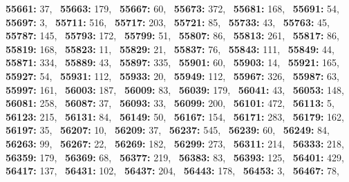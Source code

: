 \textbf{55661:} 37,\allowbreak~ 
\textbf{55663:} 179,\allowbreak~ 
\textbf{55667:} 60,\allowbreak~ 
\textbf{55673:} 372,\allowbreak~ 
\textbf{55681:} 168,\allowbreak~ 
\textbf{55691:} 54,\allowbreak~ 
\textbf{55697:} 3,\allowbreak~ 
\textbf{55711:} 516,\allowbreak~ 
\textbf{55717:} 203,\allowbreak~ 
\textbf{55721:} 85,\allowbreak~ 
\textbf{55733:} 43,\allowbreak~ 
\textbf{55763:} 45,\allowbreak~ 
\textbf{55787:} 145,\allowbreak~ 
\textbf{55793:} 172,\allowbreak~ 
\textbf{55799:} 51,\allowbreak~ 
\textbf{55807:} 86,\allowbreak~ 
\textbf{55813:} 261,\allowbreak~ 
\textbf{55817:} 86,\allowbreak~ 
\textbf{55819:} 168,\allowbreak~ 
\textbf{55823:} 11,\allowbreak~ 
\textbf{55829:} 21,\allowbreak~ 
\textbf{55837:} 76,\allowbreak~ 
\textbf{55843:} 111,\allowbreak~ 
\textbf{55849:} 44,\allowbreak~ 
\textbf{55871:} 334,\allowbreak~ 
\textbf{55889:} 43,\allowbreak~ 
\textbf{55897:} 335,\allowbreak~ 
\textbf{55901:} 60,\allowbreak~ 
\textbf{55903:} 14,\allowbreak~ 
\textbf{55921:} 165,\allowbreak~ 
\textbf{55927:} 54,\allowbreak~ 
\textbf{55931:} 112,\allowbreak~ 
\textbf{55933:} 20,\allowbreak~ 
\textbf{55949:} 112,\allowbreak~ 
\textbf{55967:} 326,\allowbreak~ 
\textbf{55987:} 63,\allowbreak~ 
\textbf{55997:} 161,\allowbreak~ 
\textbf{56003:} 187,\allowbreak~ 
\textbf{56009:} 83,\allowbreak~ 
\textbf{56039:} 179,\allowbreak~ 
\textbf{56041:} 43,\allowbreak~ 
\textbf{56053:} 148,\allowbreak~ 
\textbf{56081:} 258,\allowbreak~ 
\textbf{56087:} 37,\allowbreak~ 
\textbf{56093:} 33,\allowbreak~ 
\textbf{56099:} 200,\allowbreak~ 
\textbf{56101:} 472,\allowbreak~ 
\textbf{56113:} 5,\allowbreak~ 
\textbf{56123:} 215,\allowbreak~ 
\textbf{56131:} 84,\allowbreak~ 
\textbf{56149:} 50,\allowbreak~ 
\textbf{56167:} 154,\allowbreak~ 
\textbf{56171:} 283,\allowbreak~ 
\textbf{56179:} 162,\allowbreak~ 
\textbf{56197:} 35,\allowbreak~ 
\textbf{56207:} 10,\allowbreak~ 
\textbf{56209:} 37,\allowbreak~ 
\textbf{56237:} 545,\allowbreak~ 
\textbf{56239:} 60,\allowbreak~ 
\textbf{56249:} 84,\allowbreak~ 
\textbf{56263:} 99,\allowbreak~ 
\textbf{56267:} 22,\allowbreak~ 
\textbf{56269:} 182,\allowbreak~ 
\textbf{56299:} 273,\allowbreak~ 
\textbf{56311:} 214,\allowbreak~ 
\textbf{56333:} 218,\allowbreak~ 
\textbf{56359:} 179,\allowbreak~ 
\textbf{56369:} 68,\allowbreak~ 
\textbf{56377:} 219,\allowbreak~ 
\textbf{56383:} 83,\allowbreak~ 
\textbf{56393:} 125,\allowbreak~ 
\textbf{56401:} 429,\allowbreak~ 
\textbf{56417:} 137,\allowbreak~ 
\textbf{56431:} 102,\allowbreak~ 
\textbf{56437:} 204,\allowbreak~ 
\textbf{56443:} 178,\allowbreak~ 
\textbf{56453:} 3,\allowbreak~ 
\textbf{56467:} 78,\allowbreak~ 
